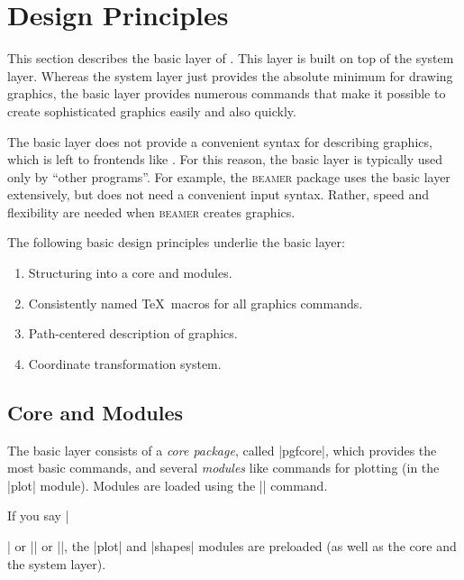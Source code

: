 %
%
%


\section{Design Principles}

This section describes the basic layer of \pgfname. This layer is built on top
of the system layer. Whereas the system layer just provides the absolute
minimum for drawing graphics, the basic layer provides numerous commands that
make it possible to create sophisticated graphics easily and also quickly.

The basic layer does not provide a convenient syntax for describing graphics,
which is left to frontends like \tikzname. For this reason, the basic layer is
typically used only by ``other programs''. For example, the \textsc{beamer}
package uses the basic layer extensively, but does not need a convenient input
syntax. Rather, speed and flexibility are needed when \textsc{beamer} creates
graphics.

The following basic design principles underlie the basic layer:
%
\begin{enumerate}
    \item Structuring into a core and modules.
    \item Consistently named \TeX\ macros for all graphics commands.
    \item Path-centered description of graphics.
    \item Coordinate transformation system.
\end{enumerate}


\subsection{Core and Modules}

The basic layer consists of a \emph{core package}, called |pgfcore|, which
provides the most basic commands, and several \emph{modules} like commands for
plotting (in the |plot| module). Modules are loaded using the |\usepgfmodule|
command.

If you say |\usepackage{pgf}| or || or |\usemodule[pgf]|, the
|plot| and |shapes| modules are preloaded (as well as the core and the system
layer).



